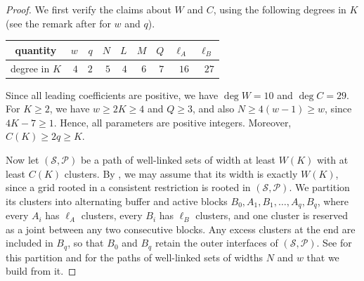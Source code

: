 \documentclass[fontsize=12pt,leading=14pt]{fullpaper}
\newcommand{\Pcal}{\mathcal{P}}
\newcommand{\Scal}{\mathcal{S}}
\begin{document}
\begin{proof}
  We first verify the claims about $W$ and $C$, using the following degrees in $K$ (see the remark after  for $w$ and $q$).
  \begin{center}
    \begin{tabular}{c|rrrrrrrr}
      quantity & $w$ & $q$ & $N$ & $L$ & $M$ & $Q$ & $\ell_A$ & $\ell_B$\\\hline
      degree in $K$ & $4$ & $2$ & $5$ & $4$ & $6$ & $7$ & $16$ & $27$
    \end{tabular}
  \end{center}
  Since all leading coefficients are positive, we have $\deg W=10$ and $\deg C=29$.
  For $K\ge2$, we have $w\ge2K\ge4$ and $Q\ge3$, and also $N\ge4(w-1)\ge w$, since $4K-7\ge1$.
  Hence, all parameters are positive integers.
  Moreover, $C(K)\ge2q\ge K$.

  Now let $(\Scal,\Pcal)$ be a path of well-linked sets of width at least $W(K)$ with at least $C(K)$ clusters.
  By , we may assume that its width is exactly $W(K)$, since a grid rooted in a consistent restriction is rooted in $(\Scal,\Pcal)$.
  We partition its clusters into alternating buffer and active blocks $B_0,A_1,B_1,\dots,A_q,B_q$, where every $A_i$ has $\ell_A$ clusters, every $B_i$ has $\ell_B$ clusters, and one cluster is reserved as a joint between any two consecutive blocks.
  Any excess clusters at the end are included in $B_q$, so that $B_0$ and $B_q$ retain the outer interfaces of $(\Scal,\Pcal)$.
  See  for this partition and for the paths of well-linked sets of widths $N$ and $w$ that we build from it.


\end{proof}
\end{document}
